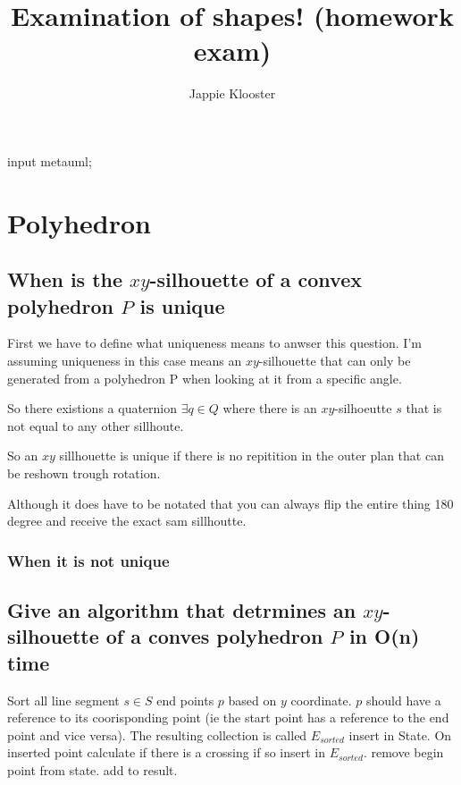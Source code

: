 \documentclass{article}
\begin{document}
\begin{empfile}
\begin{empcmds}
input metauml;
\end{empcmds}
\author{Jappie Klooster}
\title{Examination of shapes! (homework exam)}
\maketitle

\section{Polyhedron}

\subsection{When is the $xy$-silhouette of a convex polyhedron $P$ is unique}
First we have to define what uniqueness means to anwser this question. I'm 
assuming uniqueness in this case means an $xy$-silhouette that can only be
generated from a polyhedron P when looking at it from a specific angle.

So there existions a quaternion $\exists q \in Q$ where there is an $xy$-silhoeutte
$s$ that is not equal to any other sillhoute.

So an $xy$ sillhouette is unique if there is no repitition in the outer plan that
can be reshown trough rotation.

Although it does have to be notated that you can always flip the entire thing 180
degree and receive the exact sam sillhoutte.

\subsubsection{When it is not unique}
\subsection{Give an algorithm that detrmines an $xy$-silhouette of a conves polyhedron $P$ in O(n) time}
\begin{algorithmic}
	\State Sort all line segment $s \in S$ end points $p$ based on
		$y$ coordinate.
		$p$ should have a reference to its coorisponding point (ie the start
		point has a reference to the end point and vice versa). The resulting
		collection is called $E_{sorted}$
		\State
		 insert in State. On inserted point calculate
		if there is a crossing if so insert in $E_{sorted}$.
		\EndIf
		 remove begin point from state.
		\EndIf
		 add to result.
		\EndIf
	\EndFor
\end{algorithmic}


\end{empfile}
\end{document}
